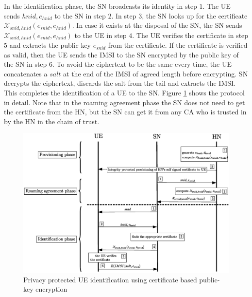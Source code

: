 \documentclass[runningheads,a4paper]{llncs} %
\begin{document}
In the identification phase, the SN broadcasts its identity in step $1$. The UE sends $hnid,e_{hnid}$ to the SN in step $2$. In step $3$, the SN looks up for the certificate $\mathcal{X}_{snid,hnid} (e_{snid},e_{hnid})$. In case it exists at the disposal of the SN, the SN sends $\mathcal{X}_{snid,hnid} (e_{snid},e_{hnid})$ to the UE in step $4$. The UE verifies the certificate in step $5$ and extracts the public key $e_{snid}$ from the certificate. If the certificate is verified as valid, then the UE sends the IMSI to the SN encrypted by the public key of the SN in step $6$. To avoid the ciphertext to be the same every time, the UE concatenates a $salt$ at the end of the IMSI of agreed length before encrypting. SN decrypts the ciphertext, discards the salt from the tail and extracts the IMSI. This completes the identification of a UE to the SN. Figure \ref{fig:solution_certificate} shows the protocol in detail. Note that in the roaming agreement phase the SN does not need to get the certificate from the HN, but the SN can get it from any CA who is trusted in by the HN in the chain of trust.
\begin{figure}
\begin{center}
  \includegraphics[width=.98\textwidth]{public_key_variation1.eps}
\caption{Privacy protected UE identification using certificate based public-key encryption}
\label{fig:solution_certificate}       %
\end{center}
\end{figure}
\end{document}
